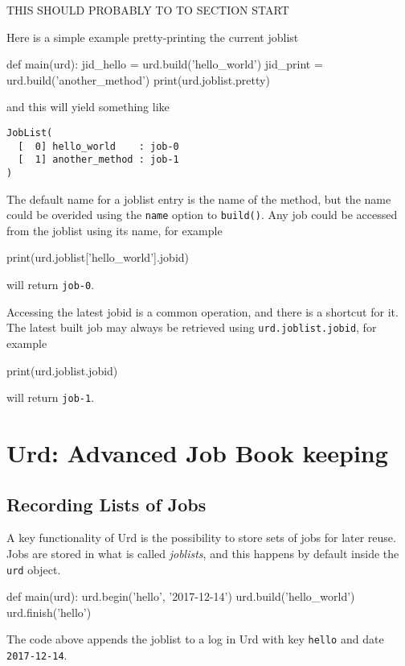 \documentclass[a4paper]{article}
\begin{document}
THIS SHOULD PROBABLY TO TO SECTION START

Here is a simple example pretty-printing the current joblist
\begin{python}
def main(urd):
  jid_hello = urd.build('hello_world')
  jid_print = urd.build('another_method')
  print(urd.joblist.pretty)
\end{python}
and this will yield something like
\begin{verbatim}
JobList(
  [  0] hello_world    : job-0
  [  1] another_method : job-1
)
\end{verbatim}
The default name for a joblist entry is the name of the method, but
the name could be overided using the \texttt{name} option to
\texttt{build()}.  Any job could be accessed from the joblist using
its name, for example
\begin{python}
  print(urd.joblist['hello_world'].jobid)
\end{python}
will return \texttt{job-0}.


Accessing the latest jobid is a common operation, and there is a
shortcut for it.  The latest built job may always be retrieved using
\texttt{urd.joblist.jobid}, for example
\begin{python}
  print(urd.joblist.jobid)
\end{python}
will return \texttt{job-1}.





\clearpage
\section{Urd: Advanced Job Book keeping}
\subsection{Recording Lists of Jobs}
A key functionality of Urd is the possibility to store sets of jobs
for later reuse.  Jobs are stored in what is called \textsl{joblists},
and this happens by default inside the \texttt{urd} object.

\begin{python}
def main(urd):
  urd.begin('hello', '2017-12-14')
  urd.build('hello_world')
  urd.finish('hello')
\end{python}
The code above appends the joblist to a log in Urd with key
\texttt{hello} and date \texttt{2017-12-14}.




\clearpage
\appendix
\end{document}
